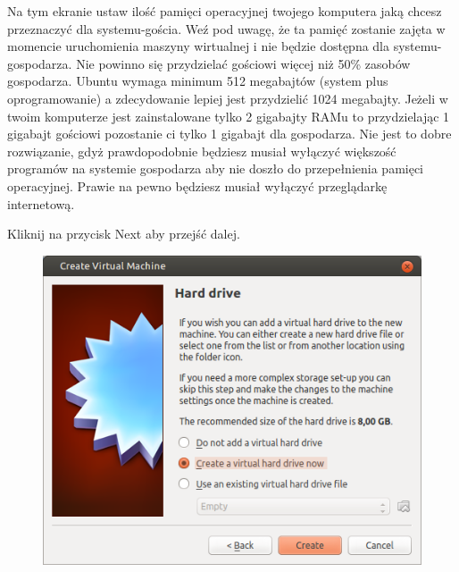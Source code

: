 Na tym ekranie ustaw ilość pamięci operacyjnej twojego komputera jaką chcesz przeznaczyć dla systemu-gościa. Weź pod uwagę, że ta pamięć zostanie zajęta w momencie uruchomienia maszyny wirtualnej i nie będzie dostępna dla systemu-gospodarza. Nie powinno się przydzielać gościowi więcej niż 50\% zasobów gospodarza. Ubuntu wymaga minimum 512 megabajtów (system plus oprogramowanie) a zdecydowanie lepiej jest przydzielić 1024 megabajty.
Jeżeli w twoim komputerze jest zainstalowane tylko 2 gigabajty RAMu to przydzielając 1 gigabajt gościowi pozostanie ci tylko 1 gigabajt dla gospodarza. Nie jest to dobre rozwiązanie, gdyż prawdopodobnie będziesz musiał wyłączyć większość programów na systemie gospodarza aby nie doszło do przepełnienia pamięci operacyjnej. Prawie na pewno będziesz musiał wyłączyć przeglądarkę internetową. 
\begin{flushright}
Kliknij na przycisk \textcolor{ubuntu_orange}{Next} aby przejść dalej.
\end{flushright}
\clearpage
\begin{figure}
                \includegraphics[width=\linewidth]{images/virtualbox_wizard3.png}
\end{figure}

